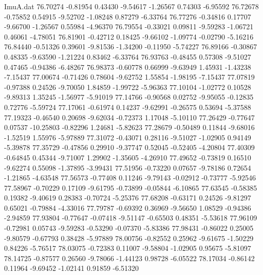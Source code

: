 \begin{filecontents}{ImuA.dat}
  76.70274   -0.81954    0.43430   -9.54617   -1.26567    0.74303   -6.95592
  76.72678   -0.75852    0.54915   -9.52702   -1.08248    0.87279   -6.33764
  76.77276   -0.34816    0.17707   -9.66700   -1.26567    0.55984   -4.96370
  76.79554   -0.33021    0.09811   -9.59283   -1.06721    0.46061   -4.78051
  76.81901   -0.42712    0.18425   -9.66102   -1.09774   -0.02790   -5.16216
  76.84440   -0.51326    0.39601   -9.81536   -1.34200   -0.11950   -5.74227
  76.89166   -0.30867    0.48335   -9.63590   -1.21224    0.83462   -6.33764
  76.93763   -0.48455    0.57308   -9.51027    0.47465   -0.94386   -6.48267
  76.98373   -0.60778    0.66999   -9.63949    1.45931   -1.43238   -7.15437
  77.00674   -0.71426    0.78604   -9.62752    1.55854   -1.98195   -7.15437
  77.07819   -0.97388    0.24526   -9.70050    1.84859   -1.99722   -5.96363
  77.10104   -1.02772    0.10528   -9.89313    1.35245   -1.56977   -5.91019
  77.14766   -0.90568    0.02752   -9.95055   -0.12835    0.72776   -5.59724
  77.17061   -0.61974    0.14237   -9.62991   -0.26575    0.53694   -5.37588
  77.19323   -0.46540    0.20698   -9.62034   -0.72373    1.17048   -5.10110
  77.26429   -0.77647    0.07537  -10.25803   -0.82296    1.24681   -5.82623
  77.28679   -0.50489    0.11844   -9.68016   -1.52519    1.55976   -5.97889
  77.31072   -0.43071    0.28116   -9.51027   -1.02905    0.94149   -5.39878
  77.35729   -0.47856    0.29910   -9.37747    0.52045   -0.52405   -4.20804
  77.40309   -0.64845    0.45344   -9.71007    1.29902   -1.35605   -4.26910
  77.49652   -0.73819    0.16510   -9.62274    0.55098   -1.37895   -3.99431
  77.51956   -0.73220    0.07657   -9.78186    0.72654   -1.21865   -4.63548
  77.56573   -0.77408    0.11246   -9.79143   -0.02912   -0.73777   -5.92546
  77.58967   -0.70229    0.17109   -9.61795   -0.73899   -0.05844   -6.10865
  77.63545   -0.58385    0.19382   -9.40619    0.28383   -0.70724   -5.25376
  77.68208   -0.63171    0.24526   -9.81297    0.65021   -0.79884   -4.33016
  77.79787   -0.69392    0.36969   -9.56650    1.08529   -0.94386   -2.94859
  77.93804   -0.77647   -0.07418   -9.51147   -0.65503    0.48351   -5.53618
  77.96109   -0.72981    0.05743   -9.59283   -0.53290   -0.07370   -5.83386
  77.98431   -0.86022    0.25005   -9.80579   -0.67793    0.38428   -5.97889
  78.00756   -0.82552    0.25962   -9.61675   -1.50229    0.84226   -5.76517
  78.03075   -0.72383    0.11007   -9.58804   -1.02905    0.95675   -5.81097
  78.14725   -0.87577    0.26560   -9.78066   -1.44123    0.98728   -6.05522
  78.17034   -0.86142    0.11964   -9.69452   -1.02141    0.91859   -6.51320

\end{filecontents}
